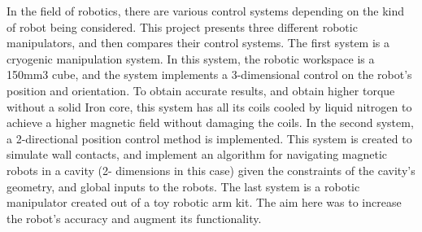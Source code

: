 


In the field of robotics, there are various control systems depending on the kind of robot being considered. This project presents three different robotic manipulators, and then compares their control systems. The first system is a cryogenic manipulation system. In this system, the robotic workspace is a 150mm3 cube, and the system implements a 3-dimensional control on the robot’s position and orientation. To obtain accurate results, and obtain higher torque without a solid Iron core, this system has all its coils cooled by liquid nitrogen to achieve a higher magnetic field without damaging the coils.  In the second system, a 2-directional position control method is implemented. This system is created to simulate wall contacts, and implement an algorithm for navigating magnetic robots in a cavity (2- dimensions in this case) given the constraints of the cavity’s geometry, and global inputs to the robots. The last system is a robotic manipulator created out of a toy robotic arm kit. The aim here was to increase the robot’s accuracy and augment its functionality. 